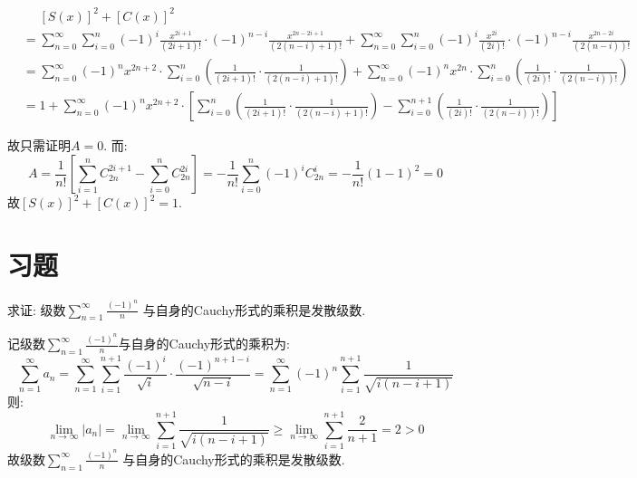 \begin{solution}
    \begin{align*}
        &\mathrel{\phantom{=}} [S(x)]^2+[C(x)]^2\\
        & = \sum_{n=0}^{\infty} \sum_{i=0}^{n} (-1)^{i}
        \frac{x^{2i+1}}{(2i+1)!} \cdot (-1)^{n-i}
        \frac{x^{2n-2i+1}}{(2(n-i)+1)!}
        + \sum_{n=0}^{\infty} \sum_{i=0}^{n} (-1)^{i}
        \frac{x^{2i}}{(2i)!} \cdot (-1)^{n-i} \frac{x^{2n -
        2i}}{(2(n-i))!}      \\
        & = \sum_{n=0}^{\infty} (-1)^n x^{2n+2} \cdot \sum_{i=0}^{n}
        \left( \frac{1}{(2i+1)!} \cdot \frac{1}{(2(n-i)+1)!} \right) +
        \sum_{n=0}^{\infty} (-1)^n x^{2n} \cdot \sum_{i=0}^{n}
        \left( \frac{1}{(2i)!} \cdot \frac{1}{(2(n-i))!} \right)
        \\
        & = 1 + \sum_{n=0}^{\infty} (-1)^n x^{2n+2}
        \cdot
        \left[ \sum_{i=0}^{n} \left( \frac{1}{(2i+1)!} \cdot
            \frac{1}{(2(n-i)+1)!} \right)
            - \sum_{i=0}^{n+1} \left( \frac{1}{(2i)!} \cdot
        \frac{1}{(2(n-i))!} \right) \right]
    \end{align*}

    故只需证明\(A=0\).
    而:
    \[
        A=\frac{1}{n!}\left[ \sum_{i=1}^{n} C^{2i+1}_{2n} -
        \sum_{i=0}^{n} C^{2i}_{2n} \right] = - \frac{1}{n!}
        \sum_{i=0}^{n} (-1)^i C^{i}_{2n} =
        - \frac{1}{n!} \left( 1 - 1 \right)^2
        =0
    \]
    故\([S(x)]^2+[C(x)]^2=1\).
\end{solution}
\section{习题}
\begin{problem}
    求证: 级数\(\sum_{n=1}^{\infty} \frac{(-1)^n}{n}\)
    与自身的Cauchy形式的乘积是发散级数.
\end{problem}

\begin{solution}
    记级数\(\sum_{n=1}^{\infty} \frac{(-1)^n}{n}\)与自身的Cauchy形式的乘积为:
    \[
        \sum_{n=1}^{\infty} a_n =
        \sum_{n=1}^{\infty} \sum_{i=1}^{n+1} \frac{(-1)^i}{\sqrt{i}}
        \cdot \frac{(-1)^{n+1-i}}{\sqrt{n-i}} =
        \sum_{n=1}^{\infty} (-1)^n \sum_{i=1}^{n+1}
        \frac{1}{\sqrt{i(n-i+1)}}
    \]
    则:
    \[
        \lim_{n \to \infty} \left\vert a_n \right\vert
        = \lim_{n \to \infty} \sum_{i=1}^{n+1}
        \frac{1}{\sqrt{i(n-i+1)}}
        \ge \lim_{n \to \infty} \sum_{i=1}^{n+1} \frac{2}{n+1} = 2
        > 0
    \]
    故级数\(\sum_{n=1}^{\infty} \frac{(-1)^n}{n}\) 与自身的Cauchy形式的乘积是发散级数.
\end{solution}

